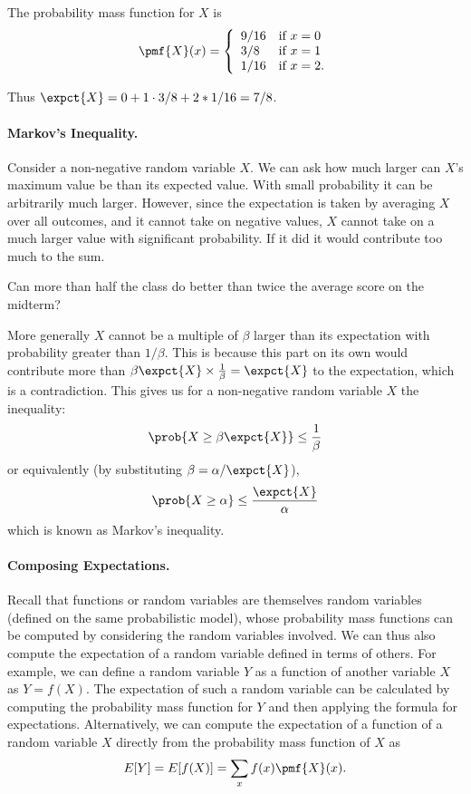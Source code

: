 {\begin{example}
The probability mass function for $X$ is
\[
\pmf{X}(x) = 
\left\{
\begin{array}{ll}
9/16 & \mbox{if}~x = 0
\\
3/8 & \mbox{if}~x = 1
\\
1/16 & \mbox{if}~x = 2.
\end{array}
\right.
\]

Thus $\expct{X} = 0 + 1 \cdot 3/8 + 2 * 1/16 = 7/8$.
\end{example}

\paragraph{Markov's Inequality.}

Consider a non-negative random variable $X$.  We can ask how much
larger can $X$'s maximum value be than its expected value.  With small
probability it can be arbitrarily much larger.  However, since the
expectation is taken by averaging $X$ over all outcomes, and it cannot
take on negative values, $X$ cannot take on a much larger value with
significant probability.  If it did it would contribute too much to
the sum.

\begin{question} 
Can more than half the class do better than twice the average score on 
the midterm?
\end{question} 

\noindent
More generally $X$ cannot be a multiple of $\beta$ larger than its
expectation with probability greater than $1/\beta$.  This is because
this part on its own would contribute more than $\beta \expct{X}
\times \frac{1}{\beta} = \expct{X}$ to the expectation, which is a
contradiction.  This gives us for a non-negative random variable $X$
the inequality:
\[ \prob{X \geq \beta\expct{X}} \leq \frac{1}{\beta} \]
or equivalently (by substituting $\beta = \alpha/\expct{X}$),
\[ \prob{X \geq \alpha} \leq \frac{\expct{X}}{\alpha} \]
which is known as Markov's inequality.

\paragraph{Composing Expectations.}
Recall that functions or random variables are themselves random
variables (defined on the same probabilistic model), whose probability
mass functions can be computed by considering the random variables
involved.
%
We can thus also compute the expectation of a random variable defined
in terms of others.
%
For example, we can define a random variable $Y$ as a function of
another variable $X$ as $Y = f(X)$.
%
The expectation of such a random variable can be calculated by
computing the probability mass function for $Y$ and then applying the
formula for expectations.
%
Alternatively, we can compute the expectation of a function of a
random variable $X$ directly from the probability mass function of $X$
as
\[
E[Y] = E[f(X)] = \sum_{x}{f(x) \pmf{X}(x)}.
\] 


}
